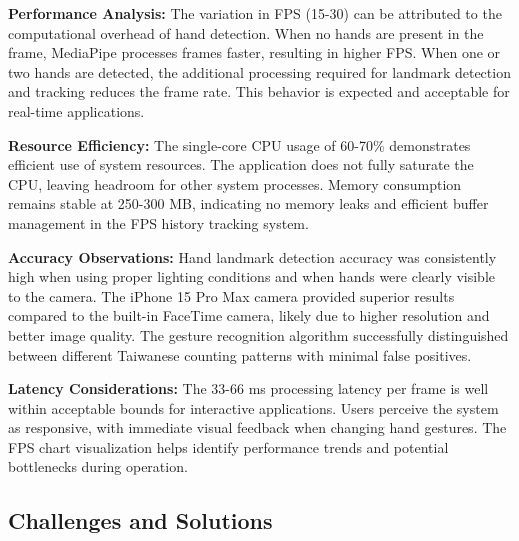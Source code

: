 \documentclass{article}
\begin{document}
\textbf{Performance Analysis:} The variation in FPS (15-30) can be attributed to the computational overhead of hand detection. When no hands are present in the frame, MediaPipe processes frames faster, resulting in higher FPS. When one or two hands are detected, the additional processing required for landmark detection and tracking reduces the frame rate. This behavior is expected and acceptable for real-time applications.

\textbf{Resource Efficiency:} The single-core CPU usage of 60-70\% demonstrates efficient use of system resources. The application does not fully saturate the CPU, leaving headroom for other system processes. Memory consumption remains stable at 250-300 MB, indicating no memory leaks and efficient buffer management in the FPS history tracking system.

\textbf{Accuracy Observations:} Hand landmark detection accuracy was consistently high when using proper lighting conditions and when hands were clearly visible to the camera. The iPhone 15 Pro Max camera provided superior results compared to the built-in FaceTime camera, likely due to higher resolution and better image quality. The gesture recognition algorithm successfully distinguished between different Taiwanese counting patterns with minimal false positives.

\textbf{Latency Considerations:} The 33-66 ms processing latency per frame is well within acceptable bounds for interactive applications. Users perceive the system as responsive, with immediate visual feedback when changing hand gestures. The FPS chart visualization helps identify performance trends and potential bottlenecks during operation.

\subsection{Challenges and Solutions}
\end{document}
